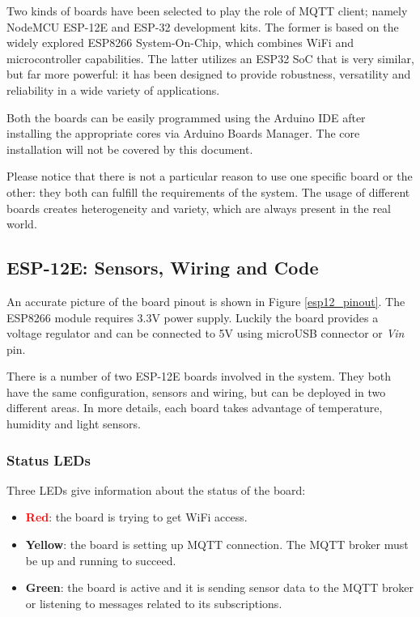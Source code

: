 Two kinds of boards have been selected to play the role of MQTT client; namely NodeMCU ESP-12E and ESP-32 development kits. The former is based on the widely explored ESP8266 System-On-Chip, which combines WiFi and microcontroller capabilities. The latter utilizes an ESP32 SoC that is very similar, but far more powerful: it has been designed to provide robustness, versatility and reliability in a wide variety of applications.

Both the boards can be easily programmed using the Arduino IDE after installing the appropriate cores via Arduino Boards Manager. The core installation will not be covered by this document.

Please notice that there is not a particular reason to use one specific board or the other: they both can fulfill the requirements of the system. The usage of different boards creates heterogeneity and variety, which are always present in the real world. 

\subsection{ESP-12E: Sensors, Wiring and Code}
\label{esp12_getting_started}
An accurate picture of the board pinout is shown in Figure \ref{esp12_pinout}. The ESP8266 module requires 3.3V power supply. Luckily the board provides a voltage regulator and can be connected to 5V using microUSB connector or \textit{Vin} pin.

There is a number of two ESP-12E boards involved in the system. They both have the same configuration, sensors and wiring, but can be deployed in two different areas.
In more details, each board takes advantage of temperature, humidity and light sensors.

\subsubsection{Status LEDs}
Three LEDs give information about the status of the board:

\begin{itemize}
	\item \textbf{\textcolor{red}{Red}}: the board is trying to get WiFi access.
	\item \textbf{\textcolor[rgb]{1,0.8,0}{Yellow}}: the board is setting up MQTT connection. The MQTT broker must be up and running to succeed.
	\item \textbf{\textcolor[rgb]{0,0.6,0}{Green}}: the board is active and it is sending sensor data to the MQTT broker or listening to messages related to its subscriptions.
\end{itemize}

